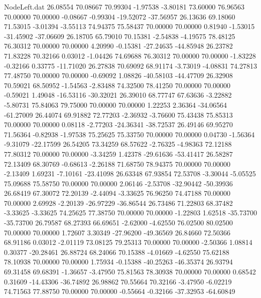 \begin{filecontents}{NodeLeft.dat}
  26.08554   70.08667   70.99304    -1.97538   -3.80181   73.60000   76.96563   70.00000   70.00000   -0.08667   -0.99304  -19.52072  -37.56957
  26.13636   69.18060   71.53015    -3.01394   -3.55113   74.94375   75.58437   70.00000   70.00000    0.81940   -1.53015  -31.45902  -37.06609
  26.18705   65.79010   70.15381    -2.54838   -4.19575   78.48125   76.30312   70.00000   70.00000    4.20990   -0.15381  -27.24635  -44.85948
  26.23782   71.83228   70.32166     0.03012   -1.04426   74.69688   76.30312   70.00000   70.00000   -1.83228   -0.32166    0.33775  -11.71020
  26.27838   70.69092   68.91174    -3.73019   -4.08831   74.27813   77.48750   70.00000   70.00000   -0.69092    1.08826  -40.58103  -44.47709
  26.32908   70.59021   68.50952    -1.54563   -2.83488   74.32500   78.41250   70.00000   70.00000   -0.59021    1.49048  -16.53116  -30.32021
  26.39010   68.77747   67.63636    -3.22882   -5.80731   75.84063   79.75000   70.00000   70.00000    1.22253    2.36364  -34.06564  -61.27009
  26.44074   69.91882   72.77203    -2.36932   -3.76600   75.43438   75.85313   70.00000   70.00000    0.08118   -2.77203  -24.36341  -38.72537
  26.49146   69.95270   71.56364    -0.82938   -1.97538   75.25625   75.33750   70.00000   70.00000    0.04730   -1.56364   -9.31079  -22.17599
  26.54205   73.34259   68.57622    -2.76325   -4.98363   72.12188   77.80312   70.00000   70.00000   -3.34259    1.42378  -29.61636  -53.41417
  26.58287   72.13409   68.30769    -0.68613   -2.26188   71.68750   78.94375   70.00000   70.00000   -2.13409    1.69231   -7.10161  -23.41098
  26.63348   67.93854   72.53708    -3.30044   -5.05525   75.09688   75.58750   70.00000   70.00000    2.06146   -2.53708  -32.90442  -50.39936
  26.68419   67.30072   72.20139    -2.44094   -3.33625   76.96250   74.47188   70.00000   70.00000    2.69928   -2.20139  -26.97229  -36.86544
  26.73486   71.22803   68.37482    -3.33625   -3.33625   74.25625   77.38750   70.00000   70.00000   -1.22803    1.62518  -35.73700  -35.73700
  26.79587   68.27393   66.69651    -2.62000   -4.62550   76.02500   80.02500   70.00000   70.00000    1.72607    3.30349  -27.96200  -49.36569
  26.84660   72.50366   68.91186     0.03012   -2.01119   73.08125   79.25313   70.00000   70.00000   -2.50366    1.08814    0.30377  -20.28461
  26.88724   68.24066   70.15388    -4.01669   -4.62550   75.62188   78.10938   70.00000   70.00000    1.75934   -0.15388  -40.25263  -46.35374
  26.93794   69.31458   69.68391    -1.36657   -3.47950   75.81563   78.30938   70.00000   70.00000    0.68542    0.31609  -14.43306  -36.74892
  26.98862   70.55664   70.32166    -3.47950   -6.02219   74.71563   77.88750   70.00000   70.00000   -0.55664   -0.32166  -37.32953  -64.60849

\end{filecontents}
